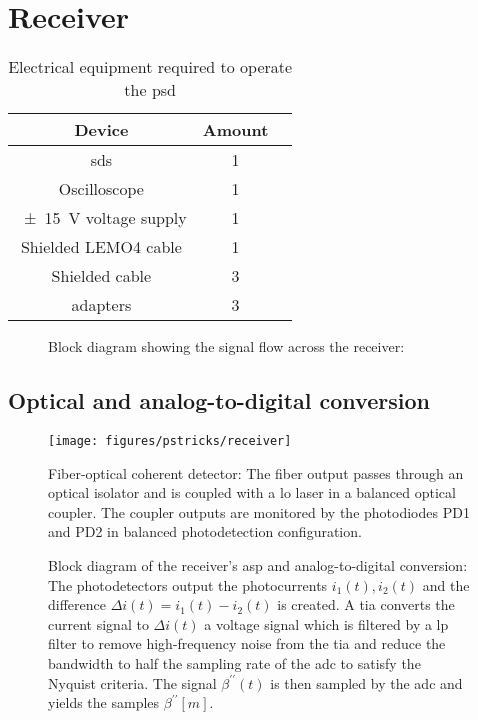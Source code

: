\section{Receiver}


\begin{table}[htb]
  \centering
  \begin{tabular}{ccl}
    \toprule
      Device & Amount \\
    \midrule
      sds & 1\\
      Oscilloscope & 1\\
      \SI{\pm15}{\volt} voltage supply & 1\\
      Shielded LEMO4 cable & 1\\
      Shielded cable & 3\\
      adapters & 3\\
    \bottomrule
  \end{tabular}
  \captionsetup{width=.8\textwidth}
  \caption{Electrical equipment required to operate the \gls{psd}}\label{tab:equipment}
\end{table}

\begin{figure}[htb]
	\centering
	
	\caption{Block diagram showing the signal flow across the receiver: }\label{fig:receiver}
\end{figure}

\subsection{Optical and analog-to-digital conversion}

\begin{figure}[htb]
	\centering
	\texttt{[image: figures/pstricks/receiver]}
	\caption{Fiber-optical coherent detector: The fiber output passes through an optical isolator and is coupled with a \gls{lo} laser in a balanced optical coupler. The coupler outputs are monitored by the photodiodes PD1 and PD2 in balanced photodetection configuration.}
\end{figure}

\begin{figure}[htb]
	\centering
	
	\caption{Block diagram of the receiver's \gls{asp} and analog-to-digital conversion: The photodetectors output the photocurrents $i_1(t),i_2(t)$ and the difference $\Delta i(t)=i_1(t)-i_2(t)$ is created. A \gls{tia} converts the current signal to $\Delta i(t)$ a voltage signal which is filtered by a \gls{lp} filter to remove high-frequency noise from the \gls{tia} and reduce the bandwidth to half the sampling rate of the \gls{adc} to satisfy the Nyquist criteria. The signal $\beta^{\prime\prime}(t)$ is then sampled by the \gls{adc} and yields the samples $\beta^{\prime\prime}[m]$.}
\end{figure}

